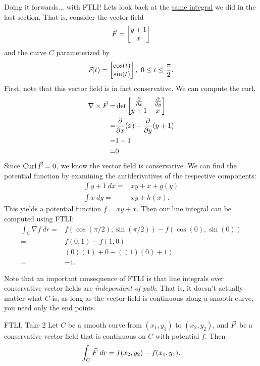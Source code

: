 \begin{example}{Doing it forwards... with FTLI!}
Lets look back at the \hyperlink{ftli}{same integral} we did in the last section. That is, consider the vector field $$\vec{F}=\begin{bmatrix}y+1\\x\end{bmatrix} $$ and the curve $C$ parameterized by $$\vec{r}(t)=\begin{bmatrix}\cos(t)\\ \sin(t)\end{bmatrix},\ 0\leq t\leq \frac{\pi}{2}.$$
First, note that this vector field is in fact conservative. We can compute the curl,
\begin{align*}
\nabla\times\vec{F}=&\det\begin{bmatrix}\frac{\partial }{\partial x}&\frac{\partial }{\partial y}\\ y+1&x\end{bmatrix}\\
=&\frac{\partial }{\partial x}(x)-\frac{\partial }{\partial y}(y+1)\\
=&1-1\\
=&0
\end{align*}
Since $\operatorname{Curl}\vec{F}=0$, we know the vector field is conservative. We can find the potential function by examining the antiderivatives of the respective components: 
\begin{align*}
\int y+1\ dx=&xy+x+g(y)\\
\int x \ dy=&xy+h(x).
\end{align*}
This yields a potential function $f=xy+x$. Then our line integral can be computed using FTLI:
\begin{align*}
\int_C\nabla f\ dr=& f(\cos(\pi/2),\sin(\pi/2))-f(\cos(0),\sin(0))\\
=&f(0,1)-f(1,0)\\
=&(0)(1)+0-((1)(0)+1)\\
=&-1.
\end{align*}
\end{example}

Note that an important consequence of FTLI is that line integrals over conservative vector fields are \textit{independant of path}. That is, it doesn't actually matter what $C$ is, as long as the vector field is continuous along a smooth curve, you need only the end points.

\begin{theorem}{FTLI, Take 2}
Let $C$ be a smooth curve from $(x_1,y_1)$ to $(x_2,y_2)$, and $\vec{F}$ be a conservative vector field that is continuous on $C$ with potential $f$. Then $$\int_C \vcF \ dr=f(x_2,y_2)-f(x_1,y_1). $$ 
\end{theorem}

